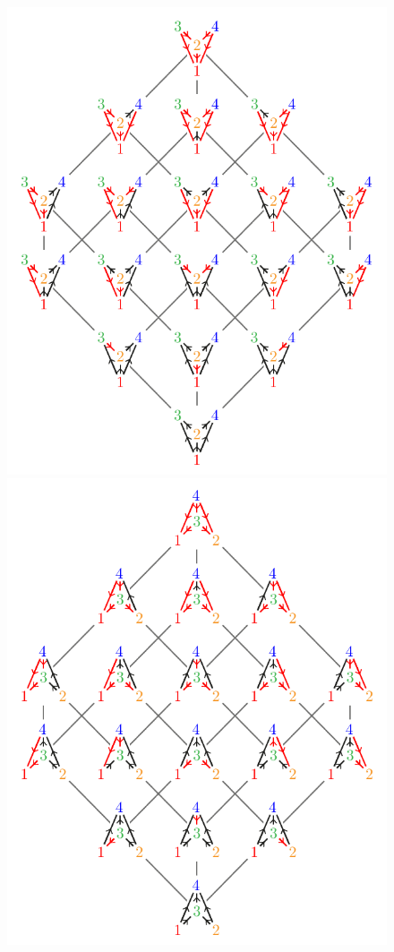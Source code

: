 \documentclass{amsart}
\theoremstyle{definition}
\begin{document}
\begin{figure}
	\centerline{\includegraphics[scale=.68]{acyclicReorientationsY} \qquad \includegraphics[scale=.68]{acyclicReorientationsA}}

\end{figure}
\end{document}
